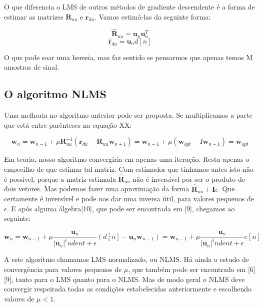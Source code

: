 \documentclass[a4paper, 12pt]{book}
\begin{document}
O que diferencia o LMS de outros métodos de gradiente descendente é a forma de estimar as matrizes $\boldsymbol{R}_{uu}$ e $\boldsymbol{r}_{du}$. Vamos estimâ-las da seguinte forma:

\begin{equation}
    \boldsymbol{\hat{R}}_{uu}=\boldsymbol{u}_n \boldsymbol{u}_{n}^T
\end{equation}
\begin{equation}
    \boldsymbol{\hat{r}}_{du}=\boldsymbol{u}_n d[n]
\end{equation}

O que pode soar uma heresia, mas faz sentido se pensarmos que apenas temos M amostras de sinal.

\subsection{O algoritmo NLMS}

Uma melhoria no algoritmo anterior pode ser proposta. Se multiplicamos a parte que está entre parênteses na equação XX:

\begin{equation}
    \boldsymbol{w}_{n}=\boldsymbol{w}_{n-1} + \mu \boldsymbol{R}_{uu}^{-1}(\boldsymbol{r}_{du}-\boldsymbol{R}_{uu} \boldsymbol{w}_{n+1}) = \boldsymbol{w}_{n-1} + \mu(\boldsymbol{w}_{opt} - I \boldsymbol{w}_{n-1}) = \boldsymbol{w}_{opt}
\end{equation}

Em teoria, nosso algoritmo convergiria em apenas uma iteração. Resta apenas o empecilho de que estimar tal matriz. Com estimador que tínhamos antes isto não é possível, porque a matriz estimada $\boldsymbol{\hat{R}}_{uu}$ não é inversível por ser o produto de dois vetores. Mas podemos fazer uma aproximação da forma $\boldsymbol{\hat{R}}_{uu} + \boldsymbol{I} \epsilon$. Que certamente é inversível e pode nos dar uma inversa útil, para valores pequenos de $\epsilon$. E após alguma álgebra[10], que pode ser encontrada em [9], chegamos ao seguinte:

\begin{equation}
    \boldsymbol{w}_{n}=\boldsymbol{w}_{n-1} + \mu \frac{\boldsymbol{u}_{n}}{|\boldsymbol{u}_{n}|^indent + \epsilon }(d[n]-\boldsymbol{u}_{n} \boldsymbol{w}_{n-1}) =\boldsymbol{w}_{n-1} + \mu \frac{\boldsymbol{u}_{n}}{|\boldsymbol{u}_{n}|^indent + \epsilon }e[n]
\end{equation}

A este algoritmo chamamos LMS normalizado, ou NLMS. Há ainda o estudo de convergência para valores pequenos de $\mu$, que também pode ser encontrado em [6][9], tanto para o LMS quanto para o NLMS. Mas de modo geral o NLMS deve convergir respeirada todas as condições estabelecidas anteriormente e escolhendo valores de $\mu<1$.
\end{document}
